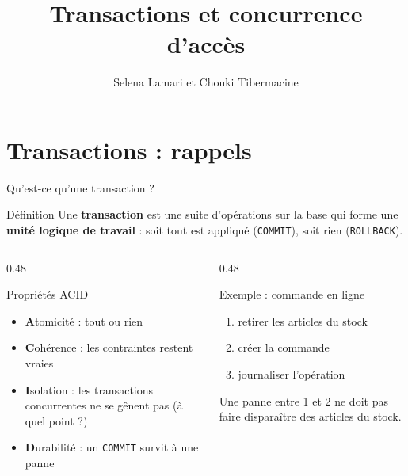 \documentclass[aspectratio=169,10pt]{beamer}
\title{Transactions et concurrence d'acc\`es}
\author[C. Tibermacine]{Selena Lamari et Chouki Tibermacine}
\date{}
\begin{document}

\section{Transactions : rappels}

\begin{frame}{Qu'est-ce qu'une transaction ?}
  \begin{block}{D\'efinition}
    Une \textbf{transaction} est une suite d'op\'erations sur la base qui forme une \textbf{unit\'e logique de travail} :
    soit tout est appliqu\'e (\texttt{COMMIT}), soit rien (\texttt{ROLLBACK}).
  \end{block}
  \begin{columns}[T]
    \begin{column}{0.48\textwidth}
      \begin{exampleblock}{Propri\'et\'es ACID}
        \begin{itemize}
          \item \textbf{A}tomicit\'e : tout ou rien
          \item \textbf{C}oh\'erence : les contraintes restent vraies
          \item \textbf{I}solation : les transactions concurrentes ne se g\^enent pas (\alert{\`a quel point ?})
          \item \textbf{D}urabilit\'e : un \texttt{COMMIT} survit \`a une panne
        \end{itemize}
      \end{exampleblock}
    \end{column}
    \begin{column}{0.48\textwidth}
      \begin{exampleblock}{Exemple : commande en ligne}
        \begin{enumerate}
          \item retirer les articles du stock
          \item cr\'eer la commande
          \item journaliser l'op\'eration
        \end{enumerate}
        Une panne entre 1 et 2 ne doit pas faire \og dispara\^itre \fg{} des articles du stock.
      \end{exampleblock}
    \end{column}
  \end{columns}
\end{frame}
\end{document}

